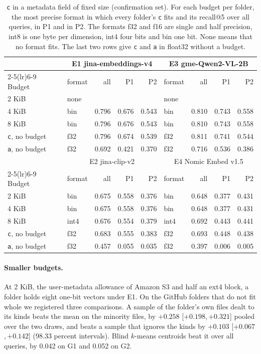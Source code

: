 \documentclass[sigconf,natbib=true,anonymous=true]{acmart}
\newcommand{\rep}[1]{\texttt{#1}}
\newcommand{\ci}[2]{[\ensuremath{#1},\,\ensuremath{#2}]}  %
\begin{document}
\begin{table}[t]
\caption{\rep{c} in a metadata field of fixed size (confirmation set). For each budget per folder, the most precise format in which every folder's \rep{c} fits and its recall@5 over all queries, in P1 and in P2. The formats f32 and f16 are single and half precision, int8 is one byte per dimension, int4 four bits and bin one bit. None means that no format fits. The last two rows give \rep{c} and \rep{a} in float32 without a budget.}
\label{tab:bytes}
\setlength{\tabcolsep}{2.9pt}
\small
\begin{tabular}{llrrrlrrr}
\toprule
& \multicolumn{4}{c}{E1 jina-embeddings-v4} & \multicolumn{4}{c}{E3 gme-Qwen2-VL-2B} \\
\cmidrule(lr){2-5}\cmidrule(lr){6-9}
Budget & format & all & P1 & P2 & format & all & P1 & P2 \\
\midrule
2 KiB & none & & & & none & & & \\
4 KiB & bin & 0.796 & 0.676 & 0.543 & bin & 0.810 & 0.743 & 0.558 \\
8 KiB & bin & 0.796 & 0.676 & 0.543 & bin & 0.810 & 0.743 & 0.558 \\
\rep{c}, no budget & f32 & 0.796 & 0.674 & 0.539 & f32 & 0.811 & 0.741 & 0.544 \\
\rep{a}, no budget & f32 & 0.692 & 0.421 & 0.370 & f32 & 0.716 & 0.536 & 0.386 \\
\midrule
& \multicolumn{4}{c}{E2 jina-clip-v2} & \multicolumn{4}{c}{E4 Nomic Embed v1.5} \\
\cmidrule(lr){2-5}\cmidrule(lr){6-9}
Budget & format & all & P1 & P2 & format & all & P1 & P2 \\
\midrule
2 KiB & bin & 0.675 & 0.558 & 0.376 & bin & 0.648 & 0.377 & 0.431 \\
4 KiB & bin & 0.675 & 0.558 & 0.376 & bin & 0.648 & 0.377 & 0.431 \\
8 KiB & int4 & 0.676 & 0.554 & 0.379 & int4 & 0.692 & 0.443 & 0.441 \\
\rep{c}, no budget & f32 & 0.683 & 0.555 & 0.383 & f32 & 0.693 & 0.448 & 0.438 \\
\rep{a}, no budget & f32 & 0.457 & 0.055 & 0.035 & f32 & 0.397 & 0.006 & 0.005 \\
\bottomrule
\end{tabular}
\end{table}

\paragraph{Smaller budgets.} At 2 KiB, the user-metadata allowance of Amazon S3 and half an ext4 block, a folder holds eight one-bit vectors under E1. On the GitHub folders that do not fit whole we registered three comparisons. A sample of the folder's own files dealt to its kinds beats the mean on the minority files, by $+0.258$ \ci{+0.198}{+0.321} pooled over the two draws, and beats a sample that ignores the kinds by $+0.103$ \ci{+0.067}{+0.142} (98.33 percent intervals). Blind $k$-means centroids beat it over all queries, by 0.042 on G1 and 0.052 on G2.
\end{document}
